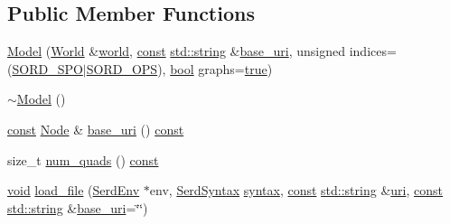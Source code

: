 \subsection*{Public Member Functions}
\begin{DoxyCompactItemize}
\item 
\hyperlink{class_sord_1_1_model_ae368374cf80e0780644a082221f8705d}{Model} (\hyperlink{class_sord_1_1_world}{World} \&\hyperlink{class_sord_1_1_model_ad3794ab0ff978bfaf68627f946a595b8}{world}, \hyperlink{getopt1_8c_a2c212835823e3c54a8ab6d95c652660e}{const} \hyperlink{test__lib_f_l_a_c_2format_8c_ab02026ad0de9fb6c1b4233deb0a00c75}{std\+::string} \&\hyperlink{class_sord_1_1_model_a477eea447cb8cd80a9a9ffcce34d48cd}{base\+\_\+uri}, unsigned indices=(\hyperlink{group__sord_ggaf490691787913fb85293d05eab00a735a51f0e1357612884f7bb7fb3ab151b3a7}{S\+O\+R\+D\+\_\+\+S\+PO}$\vert$\hyperlink{group__sord_ggaf490691787913fb85293d05eab00a735a4220624a00f2828d33e1a1cd45e18634}{S\+O\+R\+D\+\_\+\+O\+PS}), \hyperlink{mac_2config_2i386_2lib-src_2libsoxr_2soxr-config_8h_abb452686968e48b67397da5f97445f5b}{bool} graphs=\hyperlink{mac_2config_2i386_2lib-src_2libsoxr_2soxr-config_8h_a41f9c5fb8b08eb5dc3edce4dcb37fee7}{true})
\item 
\hyperlink{class_sord_1_1_model_a28bc4c2350613e970258ff27374d61f2}{$\sim$\+Model} ()
\item 
\hyperlink{getopt1_8c_a2c212835823e3c54a8ab6d95c652660e}{const} \hyperlink{class_sord_1_1_node}{Node} \& \hyperlink{class_sord_1_1_model_a477eea447cb8cd80a9a9ffcce34d48cd}{base\+\_\+uri} () \hyperlink{getopt1_8c_a2c212835823e3c54a8ab6d95c652660e}{const} 
\item 
size\+\_\+t \hyperlink{class_sord_1_1_model_aa26790f627fc8c212237b23ef59c1136}{num\+\_\+quads} () \hyperlink{getopt1_8c_a2c212835823e3c54a8ab6d95c652660e}{const} 
\item 
\hyperlink{sound_8c_ae35f5844602719cf66324f4de2a658b3}{void} \hyperlink{class_sord_1_1_model_a6bd84dd0dcb8c0a7f550de5174fba06a}{load\+\_\+file} (\hyperlink{group__serd_gaea4226dd80abea7afa05986f195d4755}{Serd\+Env} $\ast$env, \hyperlink{group__serd_ga42683406fcfa9046b28dd951cefd3391}{Serd\+Syntax} \hyperlink{cmdline_8c_a9aea52a77da0039230114dcf40c98aa6}{syntax}, \hyperlink{getopt1_8c_a2c212835823e3c54a8ab6d95c652660e}{const} \hyperlink{test__lib_f_l_a_c_2format_8c_ab02026ad0de9fb6c1b4233deb0a00c75}{std\+::string} \&\hyperlink{lib_2expat_8h_a5a9fdd6c2606370ad12f24c078ac6585}{uri}, \hyperlink{getopt1_8c_a2c212835823e3c54a8ab6d95c652660e}{const} \hyperlink{test__lib_f_l_a_c_2format_8c_ab02026ad0de9fb6c1b4233deb0a00c75}{std\+::string} \&\hyperlink{class_sord_1_1_model_a477eea447cb8cd80a9a9ffcce34d48cd}{base\+\_\+uri}=\char`\"{}\char`\"{})

\end{DoxyCompactItemize}
